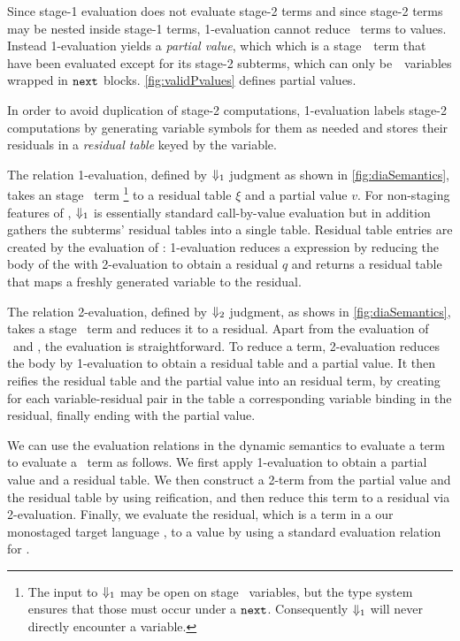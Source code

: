

Since stage-1 evaluation does not evaluate stage-2 terms and since
stage-2 terms may be nested inside stage-1 terms, 1-evaluation cannot
reduce \lang\ terms to values.  Instead 1-evaluation yields a {\em
  partial value}, which which is a stage~\bbone\ term that have been
evaluated except for its stage-2 subterms, which can only
be~\bbtwo\ variables wrapped in ${\tt next}$ blocks.  \ref{fig:validPvalues}
defines partial values.

In order to avoid duplication of stage-2 computations, 1-evaluation
labels stage-2 computations by generating variable symbols for them as
needed and stores their residuals in a {\em residual table} keyed by
the variable.


The relation 1-evaluation, defined by ${\Downarrow_{ 1}}$ judgment as shown
in \ref{fig:diaSemantics}, takes an stage \bbone\ term%
\footnote{ The input to ${\Downarrow_{ 1}}$ may be open on stage \bbtwo\ variables, but
the type system ensures that those must occur under a ${\tt next}$. Consequently
${\Downarrow_{ 1}}$ will never directly encounter a variable.}
%
to a residual table $\xi$ and a partial value $v$.  For non-staging
features of \lang, ${\Downarrow_{ 1}}$ is essentially standard call-by-value
evaluation but in addition gathers the subterms' residual tables into
a single table.  Residual table entries are created by the
evaluation of \next: 1-evaluation reduces a \next expression by
reducing the body of the \next with 2-evaluation to obtain a
residual $q$ and returns a residual table that maps a freshly
generated variable to the residual. 

The relation 2-evaluation, defined by ${\Downarrow_{ 2}}$ judgment, as shows
in \ref{fig:diaSemantics}, takes a stage \bbtwo\ term and reduces it to
a residual.  Apart from the evaluation of \prev\ and \pause, the
evaluation is straightforward. To reduce a \prev term, 2-evaluation
reduces the body by 1-evaluation to obtain a residual table and a
partial value.  It then reifies the residual table and the partial
value into an residual term, by creating for each variable-residual
pair in the table a corresponding variable binding in the residual,
finally ending with the partial value.

We can use the evaluation relations in the dynamic semantics to
evaluate a term to evaluate a \lang\ term as follows. We first apply
1-evaluation to obtain a partial value and a residual table. We then
construct a 2-term from the partial value and the residual table by
using reification, and then reduce this term to a residual via
2-evaluation.  Finally, we evaluate the residual, which is a term in a
our monostaged target language \langmono, to a value by using  a
standard evaluation relation for \langmono.

